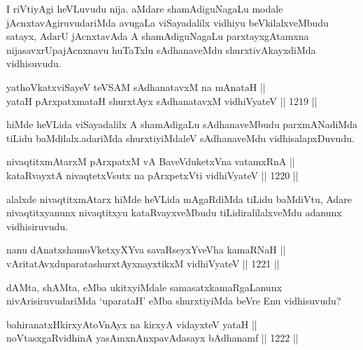 \begin{artha}
I riVtiyAgi heVLuvudu nija. aMdare shamAdiguNagaLu modale jAcnxtavAgiruvudariMda avugaLa viSayadalilx vidhiyu beVkilalxveMbudu satayx, AdarU jAcnxtavAda A shamAdiguNagaLu parxtayxgAtamxna nijasavxrUpajAcnxnavu huTaTxlu sAdhanaveMdu shurxtivAkayxdiMda vidhisuvudu.
\end{artha}


\begin{shl}
yathoVkatxviSayeV teVSAM sAdhanatavxM na mAnataH || \\
yataH pArxpatxmataH shurxtAyx sAdhanatavxM vidhiVyateV \hfill || 1219 ||  
\end{shl}

\begin{artha}
hiMde heVLida viSayadalilx A shamAdigaLu sAdhanaveMbudu parxmANadiMda tiLidu baMdilalx.adariMda shurxtiyiMdaleV sAdhanaveMdu vidhisalapxDuvudu.
\end{artha}

\begin{shl}
nivaqtitxmAtarxM pArxpatxM vA BaveVduketxVna vatamxRnA || \\
kataRvayxtA nivaqtetxVsutx na pArxpetxVti vidhiVyateV \hfill || 1220 ||  
\end{shl}

\begin{artha}
alalxde nivaqtitxmAtarx hiMde heVLida mAgaRdiMda tiLidu baMdiVtu, Adare nivaqtitxyanunx nivaqtitxyu kataRvayxveMbudu tiLidiralilalxveMdu adanunx vidhisiruvudu.
\end{artha}


\begin{shl}
nanu dAnatxshamoVketxyXYva savaRseyxYveVha kamaRNaH || \\
vAritatAvxduparatashurxtAyx\s nayxtikxM vidhiVyateV \hfill || 1221 ||  
\end{shl}

\begin{artha}
dAMta, shAMta, eMba ukitxyiMdale samasatxkamaRgaLanunx nivArisiruvudariMda `uparataH' eMba shurxtiyiMda beVre Enu vidhisuvudu?
\end{artha}

\begin{shl}
bahiranatxHkirxyAtoV\s nAyx na kirxyA vidayxteV yataH || \\
noVtasxgaRvidhinA yasAmxnAnxpavAdasayx bAdhanamf \hfill || 1222 ||  
\end{shl}

